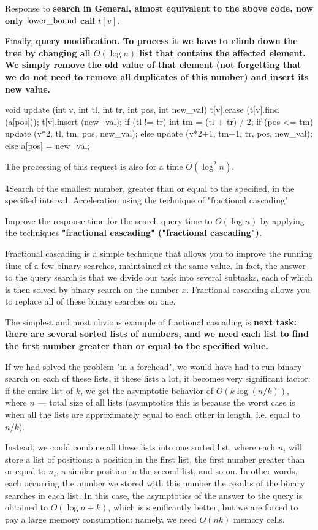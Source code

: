 Response to \bf{search} in General, almost equivalent to the above code, now only $\rm lower\_bound$ call $t[v]$.

Finally, \bf{query modification}. To process it we have to climb down the tree by changing all $O (\log n)$ list that contains the affected element. We simply remove the old value of that element (not forgetting that we do not need to remove all duplicates of this number) and insert its new value.

\code
void update (int v, int tl, int tr, int pos, int new_val) {
t[v].erase (t[v].find (a[pos]));
t[v].insert (new_val);
if (tl != tr) {
int tm = (tl + tr) / 2;
if (pos <= tm)
update (v*2, tl, tm, pos, new_val);
else
update (v*2+1, tm+1, tr, pos, new_val);
}
else
a[pos] = new_val;
}
\endcode

The processing of this request is also for a time $O (\log^2 n)$.

\h4{Search of the smallest number, greater than or equal to the specified, in the specified interval. Acceleration using the technique of "fractional cascading"}

Improve the response time for the search query time to $O (\log n)$ by applying the techniques \bf{"fractional cascading"} ("fractional cascading").

Fractional cascading is a simple technique that allows you to improve the running time of a few binary searches, maintained at the same value. In fact, the answer to the query search is that we divide our task into several subtasks, each of which is then solved by binary search on the number $x$. Fractional cascading allows you to replace all of these binary searches on one.

The simplest and most obvious example of fractional cascading is \bf{next task}: there are several sorted lists of numbers, and we need each list to find the first number greater than or equal to the specified value.

If we had solved the problem "in a forehead", we would have had to run binary search on each of these lists, if these lists a lot, it becomes very significant factor: if the entire list of $k$, we get the asymptotic behavior of $O (k \log(n/k))$, where $n$ --- total size of all lists (asymptotics this is because the worst case is when all the lists are approximately equal to each other in length, i.e. equal to $n/k$).

Instead, we could combine all these lists into one sorted list, where each $n_i$ will store a list of positions: a position in the first list, the first number greater than or equal to $n_i$, a similar position in the second list, and so on. In other words, each occurring the number we stored with this number the results of the binary searches in each list. In this case, the asymptotics of the answer to the query is obtained to $O (\log n + k)$, which is significantly better, but we are forced to pay a large memory consumption: namely, we need $O (nk)$ memory cells.

